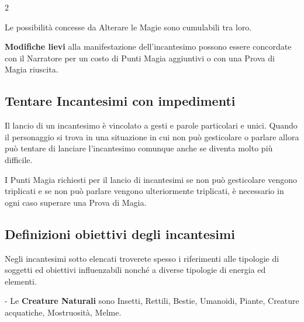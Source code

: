 \begin{multicols}{2}

\medskip

Le possibilità concesse da Alterare le Magie sono cumulabili tra loro.

\medskip

\textbf{Modifiche lievi}  alla manifestazione dell'incantesimo possono essere concordate con il Narratore per un costo di Punti Magia aggiuntivi o con una Prova di Magia riuscita.

\subsection{Tentare Incantesimi con impedimenti} \label{magieconimpedimenti}\hypertarget{magieconimpedimenti}{}

Il lancio di un incantesimo è vincolato a gesti e parole particolari e unici. Quando il personaggio si trova in una situazione in cui non può gesticolare o parlare allora può tentare di lanciare l'incantesimo comunque anche se diventa molto più difficile.

I Punti Magia richiesti per il lancio di incantesimi se non può gesticolare vengono triplicati e se non può parlare vengono ulteriormente triplicati, è necessario in ogni caso superare una Prova di Magia.

\subsection{Definizioni obiettivi degli incantesimi}\label{magiedefinizioniobiettivi}

Negli incantesimi sotto elencati troverete spesso i riferimenti alle tipologie di soggetti ed obiettivi influenzabili nonché a diverse tipologie di energia ed elementi.

- Le \textbf{Creature Naturali} sono Insetti, Rettili, Bestie, Umanoidi, Piante, Creature acquatiche, Mostruosità, Melme.


\end{multicols}
